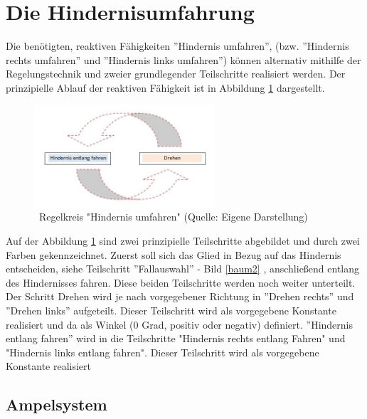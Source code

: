 \newpage
\renewcommand{\autoren}{Valentyn Chepil}
\section{Die Hindernisumfahrung}

Die benötigten, reaktiven Fähigkeiten ”Hindernis umfahren”, (bzw. ”Hindernis rechts umfahren” und ”Hindernis links umfahren”) können alternativ mithilfe der Regelungstechnik und zweier grundlegender Teilschritte realisiert werden. Der prinzipielle Ablauf der reaktiven Fähigkeit ist in Abbildung \ref{bild_HUR} dargestellt. 

\begin{figure}[!h]  %
	\centering\includegraphics[width=0.6\textwidth]{images/Bild-HUR.jpg}
	\caption{ \ Regelkreis "Hindernis umfahren" \newline (Quelle: Eigene Darstellung)}
	\label{bild_HUR} %
\end{figure}

Auf der Abbildung \ref{bild_HUR} sind zwei prinzipielle Teilschritte abgebildet und durch zwei Farben gekennzeichnet. Zuerst soll sich das Glied in Bezug auf das Hindernis entscheiden, siehe Teilschritt ”Fallauswahl” - Bild \ref{baum2} , anschließend entlang des Hindernisses fahren. Diese beiden Teilschritte werden noch weiter unterteilt. Der Schritt Drehen wird je nach vorgegebener Richtung in ”Drehen rechts” und ”Drehen links” aufgeteilt. Dieser Teilschritt wird als vorgegebene Konstante realisiert und da als Winkel (0 Grad, positiv oder negativ) definiert. ”Hindernis entlang fahren” wird in die Teilschritte "Hindernis rechts entlang Fahren" und  "Hindernis links entlang fahren". Dieser Teilschritt wird als vorgegebene Konstante realisiert

\subsection{Ampelsystem}

